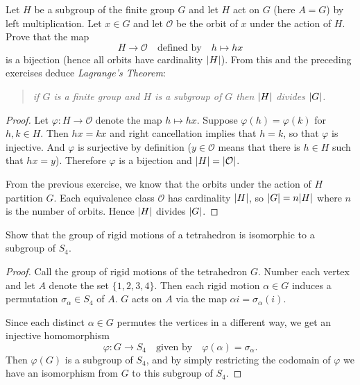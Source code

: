  Let $H$ be a subgroup of the finite group $G$ and let
$H$ act on $G$ (here $A = G$) by left multiplication. Let $x\in G$ and
let $\mathcal{O}$ be the orbit of $x$ under the action of $H$. Prove
that the map
\begin{equation*}
  H\to\mathcal{O}
  \quad\text{defined by}\quad
  h\mapsto hx
\end{equation*}
is a bijection (hence all orbits have cardinality $\lvert{H}\rvert$). From
this and the preceding exercises deduce {\em Lagrange's Theorem}:
\begin{quote}
  \em if $G$ is a finite group and $H$ is a subgroup of $G$ then
  $\lvert{H}\rvert$ divides $\lvert{G}\rvert$.
\end{quote}
\begin{proof}
  Let $\varphi\colon H\to\mathcal{O}$ denote the map $h\mapsto
  hx$. Suppose $\varphi(h) = \varphi(k)$ for $h,k\in H$. Then
  $hx = kx$ and right cancellation implies that $h = k$, so that
  $\varphi$ is injective. And $\varphi$ is surjective by definition
  ($y\in\mathcal{O}$ means that there is $h\in H$ such that $hx =
  y$). Therefore $\varphi$ is a bijection and
  $\lvert{H}\rvert = \lvert{\mathcal{O}}\rvert$.

  From the previous exercise, we know that the orbits under the action
  of $H$ partition $G$. Each equivalence class $\mathcal{O}$ has
  cardinality $\lvert{H}\rvert$, so $\lvert{G}\rvert = n\lvert{H}\rvert$ where $n$ is the
  number of orbits. Hence $\lvert{H}\rvert$ divides $\lvert{G}\rvert$.
\end{proof}

\label{exercise:intro-groups:tetrahedron-sym-iso-sub-S4}
Show that the group of rigid motions of a tetrahedron is isomorphic to
a subgroup of $S_4$.
\begin{proof}
  Call the group of rigid motions of the tetrahedron $G$. Number each
  vertex and let $A$ denote the set $\{1,2,3,4\}$. Then each rigid
  motion $\alpha\in G$ induces a permutation $\sigma_\alpha\in S_4$ of
  $A$. $G$ acts on $A$ via the map $\alpha i = \sigma_\alpha(i)$.

  Since each distinct $\alpha\in G$ permutes the vertices in a
  different way, we get an injective homomorphism
  \begin{equation*}
    \varphi\colon G\to S_4
    \quad\text{given by}\quad
    \varphi(\alpha) = \sigma_\alpha.
  \end{equation*}
  Then $\varphi(G)$ is a subgroup of $S_4$, and by simply restricting
  the codomain of $\varphi$ we have an isomorphism from $G$ to this
  subgroup of $S_4$.
\end{proof}

